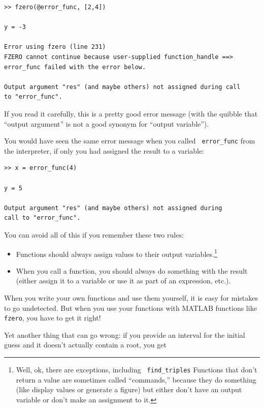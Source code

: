 \documentclass{book}
\begin{document}
\begin{verbatim}
>> fzero(@error_func, [2,4])

y = -3

Error using fzero (line 231)
FZERO cannot continue because user-supplied function_handle ==>
error_func failed with the error below.

Output argument "res" (and maybe others) not assigned during call
to "error_func".
\end{verbatim}

If you read it carefully, this is a pretty good error message
(with the quibble that ``output argument'' is not a good synonym
for ``output variable'').

You would have seen the same error message when you called {\tt
error\_func} from the interpreter, if only you had assigned the result
to a variable:

\begin{verbatim}
>> x = error_func(4)

y = 5

Output argument "res" (and maybe others) not assigned during
call to "error_func".
\end{verbatim}

You can avoid all of this if you remember these two rules:

\begin{itemize}

\item Functions should always assign values to their output
variables.\footnote{Well, ok, there are exceptions, including {\tt
find\_triples} Functions that don't return a value are sometimes
called ``commands,'' because they do something (like display
values or generate a figure) but either don't have an output
variable or don't make an assignment to it.}

\item When you call a function, you should always do something with
the result (either assign it to a variable or use it as part of an
expression, etc.).

\end{itemize}

When you write your own functions and use them yourself, it is easy
for mistakes to go undetected.  But when you use your functions with
MATLAB functions like {\tt fzero}, you have to get it right!

Yet another thing that can go wrong: if you provide an interval for the
initial guess and it doesn't actually contain a root, you get
\end{document}
